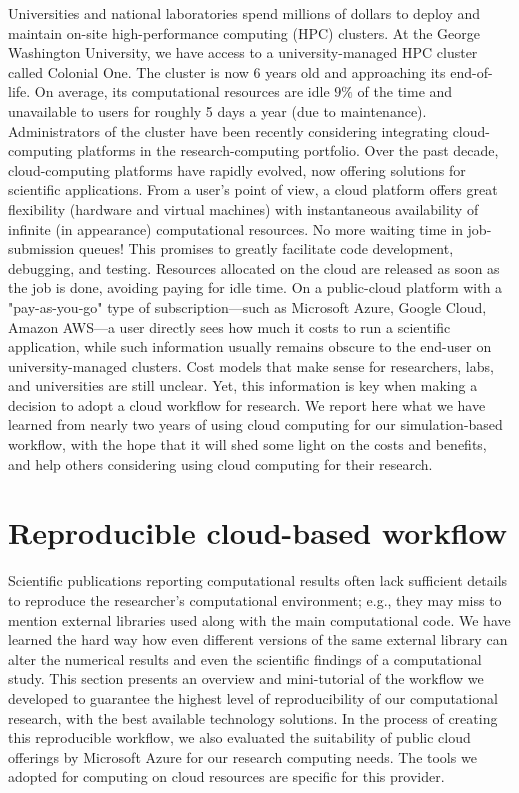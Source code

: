 \documentclass[10pt,journal,compsoc]{IEEEtran}
\begin{document}
Universities and national laboratories spend millions of dollars to deploy and maintain on-site high-performance computing (HPC) clusters.
At the George Washington University, we have access to a university-managed HPC cluster called Colonial One.
The cluster is now $6$ years old and approaching its end-of-life.
On average, its computational resources are idle $9\%$ of the time and unavailable to users for roughly 5 days a year (due to maintenance).
Administrators of the cluster have been recently considering integrating cloud-computing platforms in the research-computing portfolio. 
Over the past decade, cloud-computing platforms have rapidly evolved, now offering solutions for scientific applications.
From a user's point of view, a cloud platform offers great flexibility (hardware and virtual machines) with instantaneous availability of infinite (in appearance) computational resources.
No more waiting time in job-submission queues!
This promises to greatly facilitate code development, debugging, and testing. Resources allocated on the cloud are released as soon as the job is done, avoiding paying for idle time.
On a public-cloud platform with a "pay-as-you-go" type of subscription---such as Microsoft Azure, Google Cloud, Amazon AWS---a user directly sees how much it costs to run a scientific application, while such information usually remains obscure to the end-user on university-managed clusters. 
Cost models that make sense for researchers, labs, and universities are still unclear. 
Yet, this information is key when making a decision to adopt a cloud workflow for research. 
We report here what we have learned from nearly two years of using cloud computing for our simulation-based workflow, with the hope that it will shed some light on the costs and benefits, and help others considering using cloud computing for their research.

\section{Reproducible cloud-based workflow}\label{sec:workflow}

Scientific publications reporting computational results often lack sufficient details to reproduce the researcher's computational environment; e.g., they may miss to mention external libraries used along with the main computational code.
We have learned the hard way how even different versions of the same external library can alter the numerical results and even the scientific findings of a computational study\cite{mesnard_barba_2017}.
This section presents an overview and mini-tutorial of the workflow we developed to guarantee the highest level of reproducibility of our computational research, with the best available technology solutions. 
In the process of creating this reproducible workflow, we also evaluated the suitability of public cloud offerings by Microsoft Azure for our research computing needs. 
The tools we adopted for computing on cloud resources are specific for this provider. 
\end{document}
